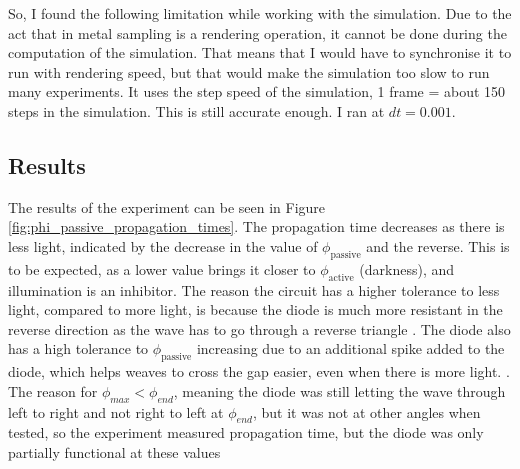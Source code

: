 So, I found the following limitation while working with the simulation. Due to the act that in metal sampling is a rendering operation, it cannot be done during the computation of the simulation. That means that I would have to synchronise it to run with rendering speed, but that would make the simulation too slow to run many experiments. It uses the step speed of the simulation, 1 frame = about 150 steps in the simulation. This is still accurate enough. I ran at $dt=0.001$.

\subsection{Results}

The results of the experiment can be seen in Figure \ref{fig:phi_passive_propagation_times}. The propagation time decreases as there is less light, indicated by the decrease in the value of $\phi_{\text{passive}}$ and the reverse. This is to be expected, as a lower value brings it closer to $\phi_{\text{active}}$ (darkness), and illumination is an inhibitor. 
The reason the circuit has a higher tolerance to less light, compared to more light, is because the diode is much more resistant in the reverse direction as the wave has to go through a reverse triangle . 
The diode also has a high tolerance to $\phi_{\text{passive}}$ increasing due to an additional spike added to the diode, which helps weaves to cross the gap easier, even when there is more light. . The reason for $\phi_{max} < \phi_{end}$, meaning the diode was still letting the wave through left to right and not right to left at $\phi_{end}$, but it was not at other angles when tested, so the experiment measured propagation time, but the diode was only partially functional at these values

